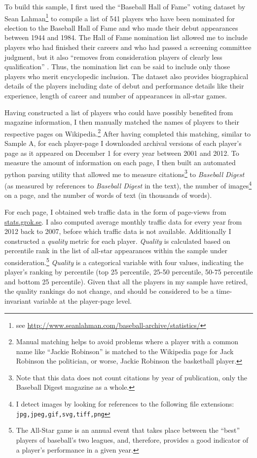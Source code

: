 \documentclass[11pt]{article}
\begin{document}
To build this sample, I first used the ``Baseball Hall of Fame'' voting dataset by Sean Lahman\footnote{see \url{http://www.seanlahman.com/baseball-archive/statistics/}} to compile a list of 541 players who have been nominated for election to the Baseball Hall of Fame and who made their debut appearances between 1944 and 1984. The Hall of Fame nomination list allowed me to include players who had finished their careers and who had passed a screening committee judgment, but it also ``removes from consideration players of clearly less qualification'' \citep{abbott_future_2011}. Thus, the nomination list can be said to include only those players who merit encyclopedic inclusion. The dataset also provides biographical details of the players including date of debut and performance details like their experience, length of career and number of appearances in all-star games.  

Having constructed a list of players who could have possibly benefited from magazine information, I then manually matched the names of players to their respective pages on Wikipedia.\footnote{Manual matching helps to avoid problems where a player with a common name like ``Jackie Robinson'' is matched to the Wikipedia page for Jack Robinson the politician, or worse, Jackie Robinson the basketball player.} After having completed this matching, similar to Sample A, for each player-page I downloaded archival versions of each player's page as it appeared on December 1 for every year between 2001 and 2012. To measure the amount of information on each page, I then built an automated python parsing utility that allowed me to measure citations\footnote{Note that this data does not count citations by year of publication, only the Baseball Digest magazine as a whole.} to \emph{Baseball Digest} (as measured by references to \emph{Baseball Digest} in the text), the number of images\footnote{I detect images by looking for references to the following file extensions: \texttt{jpg,jpeg,gif,svg,tiff,png}} on a page, and the number of words of text (in thousands of words).

For each page, I obtained web traffic data in the form of page-views from \url{stats.grok.se}. I also computed average monthly traffic data for every year from 2012 back to 2007, before which traffic data is not available. Additionally I constructed a \emph{quality} metric for each player. \emph{Quality} is calculated based on percentile rank in the list of all-star appearances within the sample under consideration.\footnote{The All-Star game is an annual event that takes place between the ``best'' players of baseball's two leagues, and, therefore, provides a good indicator of a player's performance in a given year.} \emph{Quality} is a categorical variable with four values, indicating the player's ranking by percentile (top 25 percentile, 25-50 percentile, 50-75 percentile and bottom 25 percentile). Given that all the players in my sample have retired, the quality rankings do not change, and should be considered to be a time-invariant variable at the player-page level. 
\end{document}
